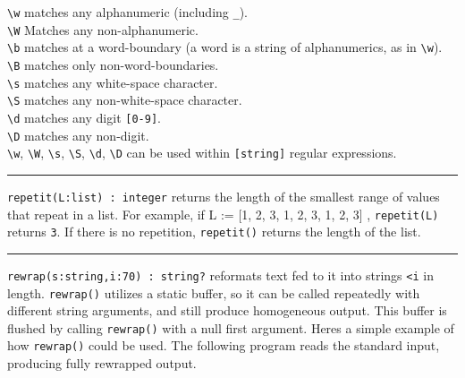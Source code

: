 \texttt{{\textbackslash}w} matches any alphanumeric (including
\texttt{{\textquotedbl}\_{\textquotedbl}}).\\
\texttt{{\textbackslash}W} Matches any non-alphanumeric.\\
\texttt{{\textbackslash}b} matches at a word-boundary (a word is
a string of alphanumerics, as in \texttt{{\textbackslash}w}).\\
\texttt{{\textbackslash}B} matches only non-word-boundaries.\\
\texttt{{\textbackslash}s} matches any white-space character.\\
\texttt{{\textbackslash}S} matches any non-white-space
character.\\
\texttt{{\textbackslash}d} matches any digit \texttt{[0-9]}.\\
\texttt{{\textbackslash}D} matches any non-digit.\\
\texttt{{\textbackslash}w}, \texttt{{\textbackslash}W},
\texttt{{\textbackslash}s}, \texttt{{\textbackslash}S},
\texttt{{\textbackslash}d}, \texttt{{\textbackslash}D} can be used
within \texttt{[string]} regular expressions.

\vspace{0.25cm}\hrule{}

\texttt{repetit(L:list) : integer} returns the length of the smallest
range of values that repeat in a list. For example, if L := [1, 2, 3,
1, 2, 3, 1, 2, 3] , \texttt{repetit(L)} returns \texttt{3}. If there is
no repetition, \texttt{repetit()} returns the length of the list. 

\vspace{0.25cm}\hrule{}

\texttt{rewrap(s:string,i:70) : string?} reformats text fed to it into
strings \texttt{{\textless}i} in length. \texttt{rewrap()} utilizes a
static buffer, so it can be called repeatedly with different string
arguments, and still produce homogeneous output. This buffer is flushed
by calling \texttt{rewrap()} with a null first argument.
Here{\textquotesingle}s a simple example of how \texttt{rewrap()} could
be used. The following program reads the standard input, producing
fully rewrapped output.


